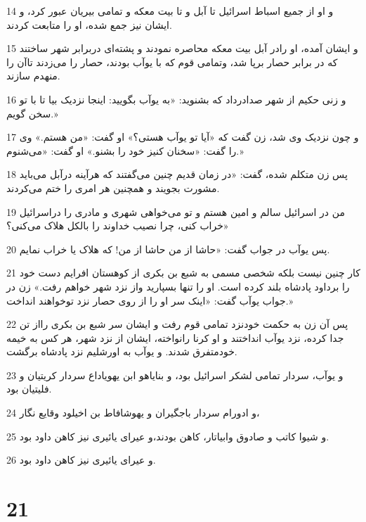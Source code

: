\par 14 و او از جمیع اسباط اسرائیل تا آبل و تا بیت معکه و تمامی بیریان عبور کرد، و ایشان نیز جمع شده، او را متابعت کردند.
\par 15 و ایشان آمده، او رادر آبل بیت معکه محاصره نمودند و پشته‌ای دربرابر شهر ساختند که در برابر حصار برپا شد، وتمامی قوم که با یوآب بودند، حصار را می‌زدند تاآن را منهدم سازند.
\par 16 و زنی حکیم از شهر صدادرداد که بشنوید: «به یوآب بگویید: اینجا نزدیک بیا تا با تو سخن گویم.»
\par 17 و چون نزدیک وی شد، زن گفت که «آیا تو یوآب هستی؟» او گفت: «من هستم.» وی را گفت: «سخنان کنیز خود را بشنو.» او گفت: «می‌شنوم.»
\par 18 پس زن متکلم شده، گفت: «در زمان قدیم چنین می‌گفتند که هرآینه درآبل می‌باید مشورت بجویند و همچنین هر امری را ختم می‌کردند.
\par 19 من در اسرائیل سالم و امین هستم و تو می‌خواهی شهری و مادری را دراسرائیل خراب کنی، چرا نصیب خداوند را بالکل هلاک می‌کنی؟»
\par 20 پس یوآب در جواب گفت: «حاشا از من حاشا از من! که هلاک یا خراب نمایم.
\par 21 کار چنین نیست بلکه شخصی مسمی به شبع بن بکری از کوهستان افرایم دست خود را برداود پادشاه بلند کرده است. او را تنها بسپارید واز نزد شهر خواهم رفت.» زن در جواب یوآب گفت: «اینک سر او را از روی حصار نزد توخواهند انداخت.»
\par 22 پس آن زن به حکمت خودنزد تمامی قوم رفت و ایشان سر شبع بن بکری رااز تن جدا کرده، نزد یوآب انداختند و او کرنا رانواخته، ایشان از نزد شهر، هر کس به خیمه خودمتفرق شدند. و یوآب به اورشلیم نزد پادشاه برگشت.
\par 23 و یوآب، سردار تمامی لشکر اسرائیل بود، و بنایاهو ابن یهویاداع سردار کریتیان و فلیتیان بود.
\par 24 و ادورام سردار باجگیران و یهوشافاط بن اخیلود وقایع نگار،
\par 25 و شیوا کاتب و صادوق وابیاتار، کاهن بودند،و عیرای یائیری نیز کاهن داود بود.
\par 26 و عیرای یائیری نیز کاهن داود بود.
 
\chapter{21}


